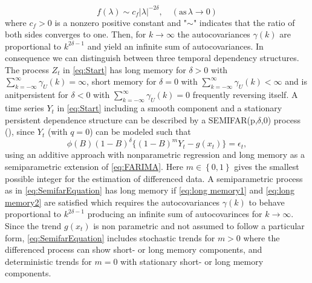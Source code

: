 \documentclass[12pt]{article}
\begin{document}
\begin{equation}
\label{eq:long memory2}
f(\lambda) \sim c_f |\lambda|^{-2\delta}, \quad (\text{as}\, \lambda \rightarrow 0)
\end{equation}
where \(c_f > 0\) is a nonzero positive constant and "\(\sim\)" indicates that the ratio of both sides converges to one. 
Then, for \(k \rightarrow \infty\) the autocovariances \( \gamma(k) \) are proportional to \(k^{2\delta - 1}\) and yield an infinite sum of autocovariances. 
In consequence we can distinguish between three temporal dependency structures.
%
The process \(Z_t\) in \eqref{eq:Start} has long memory for \(\delta > 0\) with \( \sum_{k=-\infty}^{\infty} \gamma_{U}(k) = \infty  \), short memory for \(\delta = 0\) with \( \sum_{k=-\infty}^{\infty} \gamma_{U}(k) < \infty  \)
and is anitpersistent for \(\delta < 0\) with \( \sum_{k=-\infty}^{\infty} \gamma_{U}(k) = 0  \) frequently reversing itself. 
%
A time series \(Y_t\) in \eqref{eq:Start} including a smooth component and a stationary persistent dependence structure 
can be described by a SEMIFAR(p,\(\delta\),\(0\)) process (\textcite{beran1998unified,beran2002semifar}), since \(Y_t\) (with \(q = 0\)) can be modeled such that
\begin{equation}
\label{eq:SemifarEquation}
	\phi(B)(1-B)^{\delta} \{(1-B)^m Y_t - g(x_t)\}= \epsilon_t,
\end{equation}
using an additive approach with nonparametric regression and long memory as a semiparametric extension of \eqref{eq:FARIMA}. 
Here \(m \in \left\lbrace 0,1 \right\rbrace \) gives the smallest possible integer for the estimation of differenced data.
%
A semiparametric process as in \eqref{eq:SemifarEquation} has long memory if \eqref{eq:long memory1} and \eqref{eq:long memory2} are satisfied which requires the autocovariances \( \gamma(k) \) to behave proportional to \(k^{2\delta - 1}\) producing an infinite sum of autocovarinces for \(k \rightarrow \infty \). 
Since the trend \( g(x_t) \) is non parametric and not assumed to follow a particular form, \eqref{eq:SemifarEquation} includes stochastic trends for \(m > 0\) where the differenced process can show short- or long memory components, and deterministic trends for \(m = 0\) with stationary short- or long memory components.
\end{document}
